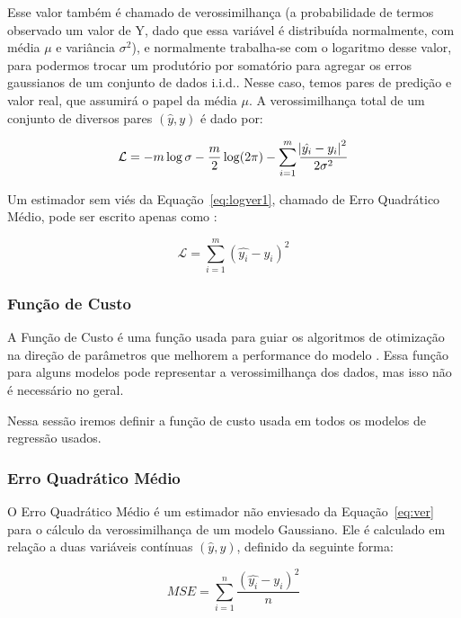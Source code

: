 Esse valor também é chamado de verossimilhança (a probabilidade de termos
observado um valor de Y, dado que essa variável é distribuída normalmente, com média $\mu$ e variância $\sigma^2$), e
normalmente trabalha-se com o logaritmo desse valor, para podermos trocar um
produtório por somatório para agregar os erros gaussianos de um conjunto de dados
i.i.d.. Nesse caso, temos pares de predição e valor real, que assumirá o papel
da média $\mu$. A verossimilhança total de um conjunto de diversos pares
$(\hat{y},y)$ é dado por: 

\begin{equation}
\label{eq:logver1}
  \mathcal{L}= -m \log \sigma - \frac{m}{2} \log (2 \pi) - \sum^m_{i=1}
  \frac{\abs{\hat{y_i}-y_i}^2}{2 \sigma^2}
\end{equation}

Um estimador sem viés da Equação~\ref{eq:logver1}, chamado de Erro Quadrático
Médio, pode ser escrito apenas como \citep{mlprob}:

\begin{equation}
  \label{eq:logver2}
  \mathcal{L}=  \sum^m_{i=1} (\hat{y_i}-y_i)^2
\end{equation}


\subsubsection{Função de Custo}

A Função de Custo é uma função usada para guiar os algoritmos de otimização na
direção de parâmetros que melhorem a performance do modelo \citep{dlbook}.
Essa função para alguns modelos pode representar a verossimilhança dos dados,
mas isso não é necessário no geral.

Nessa sessão iremos definir a função de custo usada em todos os modelos de regressão usados. \\

\subsubsection{Erro Quadrático Médio}
\label{sec:MSE}

O Erro Quadrático Médio é um estimador não enviesado da Equação~\ref{eq:ver}
\citep{dlbook} para o cálculo da verossimilhança de um modelo Gaussiano. Ele é calculado em relação a duas variáveis contínuas
$(\hat{y},y)$, definido da seguinte forma:

\[MSE = \sum^n_{i=1}\frac{(\hat{y_i} - y_i)^2}{n}\]

